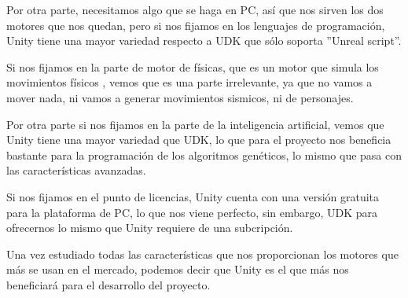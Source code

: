 Por otra parte, necesitamos algo que se haga en PC, así que nos sirven los dos motores que nos quedan, pero si nos fijamos en los lenguajes de programación, Unity tiene una mayor variedad respecto a UDK que sólo soporta ''Unreal script''.

Si nos fijamos en la parte de motor de físicas, que es un motor que simula los movimientos físicos \cite{B11}, vemos que es una parte irrelevante, ya que no vamos a mover nada, ni vamos a generar movimientos sismicos, ni de personajes.

Por otra parte si nos fijamos en la parte de la inteligencia artificial, vemos que Unity tiene una mayor variedad que UDK, lo que para el proyecto nos beneficia bastante para la programación de los algoritmos genéticos, lo mismo que pasa con las características avanzadas.

Si nos fijamos en el punto de licencias, Unity cuenta con una versión gratuita para la plataforma de PC, lo que nos viene perfecto, sin embargo, UDK para ofrecernos lo mismo que Unity requiere de una subcripción.

Una vez estudiado todas las características que nos proporcionan los motores que más se usan en el mercado, podemos decir que Unity es el que más nos beneficiará para el desarrollo del proyecto.


\newpage




